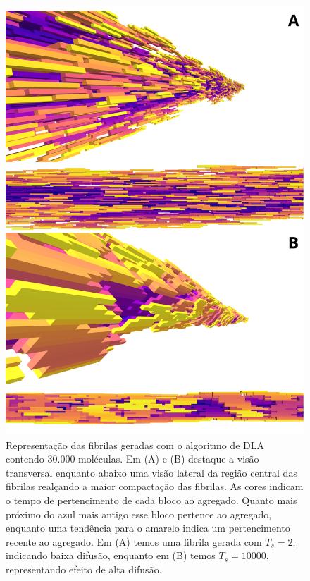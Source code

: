\documentclass[11pt,a4paper]{article} %
\begin{document}
        \begin{figure}[H] 

            \centering 
            \includegraphics[width=\textwidth]{figures/fibrils.png} 
            \caption{Representação das fibrilas geradas com o algoritmo de DLA contendo $30.000$ moléculas.  
            Em (A) e (B) destaque a visão transversal enquanto abaixo uma visão lateral da região central 
            das fibrilas realçando a maior compactação das fibrilas. As cores indicam  
            o tempo de pertencimento de cada bloco ao agregado. Quanto mais próximo do azul mais antigo esse  
            bloco pertence ao agregado, enquanto uma tendência para o amarelo indica um pertencimento recente  
            ao agregado. Em (A) temos uma fibrila gerada com \(T_{s} = 2\), indicando baixa difusão, enquanto  
            em (B) temos \(T_{s} = 10000\), representando efeito de alta difusão.}  
            \label{R1} 

        \end{figure} 
\end{document}
